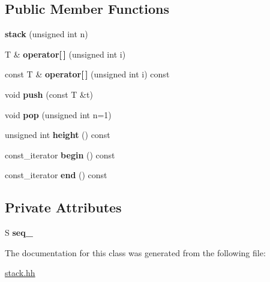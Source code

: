 \subsection*{Public Member Functions}
\begin{DoxyCompactItemize}
\item 
\hypertarget{classyy_1_1stack_af4277ae80177abc36f242c3646cbcfbe}{{\bfseries stack} (unsigned int n)}\label{classyy_1_1stack_af4277ae80177abc36f242c3646cbcfbe}

\item 
\hypertarget{classyy_1_1stack_a1058b8b7e1a3e0aa7b1e6f2f1a62c234}{T \& {\bfseries operator\mbox{[}$\,$\mbox{]}} (unsigned int i)}\label{classyy_1_1stack_a1058b8b7e1a3e0aa7b1e6f2f1a62c234}

\item 
\hypertarget{classyy_1_1stack_a46778e0ee1fd32a559008d5a261df098}{const T \& {\bfseries operator\mbox{[}$\,$\mbox{]}} (unsigned int i) const }\label{classyy_1_1stack_a46778e0ee1fd32a559008d5a261df098}

\item 
\hypertarget{classyy_1_1stack_a5ff563955472eca36f73f6e840df2963}{void {\bfseries push} (const T \&t)}\label{classyy_1_1stack_a5ff563955472eca36f73f6e840df2963}

\item 
\hypertarget{classyy_1_1stack_a0800c0a796cade80c3ce9a785dc87564}{void {\bfseries pop} (unsigned int n=1)}\label{classyy_1_1stack_a0800c0a796cade80c3ce9a785dc87564}

\item 
\hypertarget{classyy_1_1stack_a968303842836fd4e9e3994a4e3984191}{unsigned int {\bfseries height} () const }\label{classyy_1_1stack_a968303842836fd4e9e3994a4e3984191}

\item 
\hypertarget{classyy_1_1stack_a3939df081955a4ad78e14eeb9b2b5dbf}{const\-\_\-iterator {\bfseries begin} () const }\label{classyy_1_1stack_a3939df081955a4ad78e14eeb9b2b5dbf}

\item 
\hypertarget{classyy_1_1stack_a27ade5b933a4dc8a27960c88addda2a0}{const\-\_\-iterator {\bfseries end} () const }\label{classyy_1_1stack_a27ade5b933a4dc8a27960c88addda2a0}

\end{DoxyCompactItemize}
\subsection*{Private Attributes}
\begin{DoxyCompactItemize}
\item 
\hypertarget{classyy_1_1stack_ae0a9cbe8fb11651438de273ee7a6ef2e}{S {\bfseries seq\-\_\-}}\label{classyy_1_1stack_ae0a9cbe8fb11651438de273ee7a6ef2e}

\end{DoxyCompactItemize}


The documentation for this class was generated from the following file\-:\begin{DoxyCompactItemize}
\item 
\hyperlink{stack_8hh}{stack.\-hh}\end{DoxyCompactItemize}
